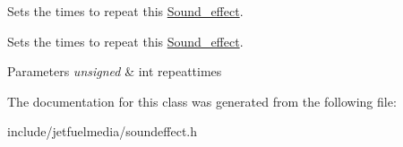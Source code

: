 Sets the times to repeat this \hyperlink{classjetfuel_1_1media_1_1Sound__effect}{Sound\+\_\+effect}. 

Sets the times to repeat this \hyperlink{classjetfuel_1_1media_1_1Sound__effect}{Sound\+\_\+effect}.


\begin{DoxyParams}{Parameters}
{\em unsigned} & int repeattimes \\
\hline
\end{DoxyParams}


The documentation for this class was generated from the following file\+:\begin{DoxyCompactItemize}
\item 
include/jetfuelmedia/soundeffect.\+h\end{DoxyCompactItemize}
